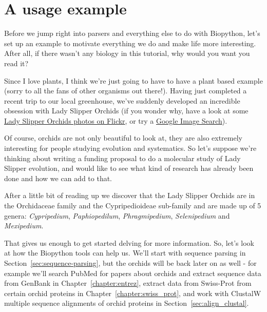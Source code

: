 \documentclass{report}
\begin{document}
\section{A usage example}
\label{sec:orchids}

Before we jump right into parsers and everything else to do with Biopython, let's set up an example to motivate everything we do and make life more interesting. After all, if there wasn't any biology in this tutorial, why would you want you read it?

Since I love plants, I think we're just going to have to have a plant based example (sorry to all the fans of other organisms out there!).  Having just completed a recent trip to our local greenhouse, we've suddenly developed an incredible obsession with Lady Slipper Orchids (if you wonder why, have a look at some \href{http://www.flickr.com/search/?q=lady+slipper+orchid&s=int&z=t}{Lady Slipper Orchids photos on Flickr}, or try a \href{http://images.google.com/images?q=lady%20slipper%20orchid}{Google Image Search}).

Of course, orchids are not only beautiful to look at, they are also extremely interesting for people studying evolution and systematics. So let's suppose we're thinking about writing a funding proposal to do a molecular study of Lady Slipper evolution, and would like to see what kind of research has already been done and how we can add to that.


After a little bit of reading up we discover that the Lady Slipper Orchids are in the Orchidaceae family and the Cypripedioideae sub-family and are made up of 5 genera:  \emph{Cypripedium}, \emph{Paphiopedilum}, \emph{Phragmipedium}, \emph{Selenipedium} and \emph{Mexipedium}.

That gives us enough to get started delving for more information. So, let's look at how the Biopython tools can help us.  We'll start with sequence parsing in Section~\ref{sec:sequence-parsing}, but the orchids will be back later on as well - for example we'll search PubMed for papers about orchids and extract sequence data from GenBank in Chapter~\ref{chapter:entrez}, extract data from Swiss-Prot from certain orchid proteins in Chapter~\ref{chapter:swiss_prot}, and work with ClustalW multiple sequence alignments of orchid proteins in Section~\ref{sec:align_clustal}.
\end{document}
